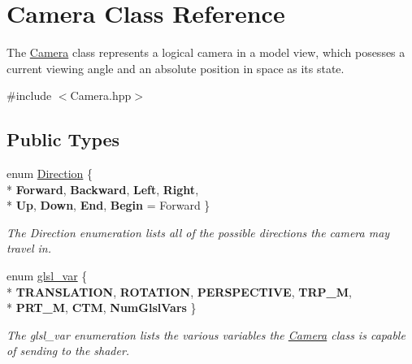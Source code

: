 \hypertarget{class_camera}{\section{Camera Class Reference}
\label{class_camera}
}


The \hyperlink{class_camera}{Camera} class represents a logical camera in a model view, which posesses a current viewing angle and an absolute position in space as its state.  




{\ttfamily \#include $<$Camera.\-hpp$>$}

\subsection*{Public Types}
\begin{DoxyCompactItemize}
\item 
enum \hyperlink{class_camera_a80cb65605322d27ad3b6d973484509ec}{Direction} \{ \\*
{\bfseries Forward}, 
{\bfseries Backward}, 
{\bfseries Left}, 
{\bfseries Right}, 
\\*
{\bfseries Up}, 
{\bfseries Down}, 
{\bfseries End}, 
{\bfseries Begin} =  Forward
 \}
\begin{DoxyCompactList}\small\item\em The Direction enumeration lists all of the possible directions the camera may travel in. \end{DoxyCompactList}\item 
enum \hyperlink{class_camera_a6ff726a75a430e4f17e5dec42e4d4405}{glsl\-\_\-var} \{ \\*
{\bfseries T\-R\-A\-N\-S\-L\-A\-T\-I\-O\-N}, 
{\bfseries R\-O\-T\-A\-T\-I\-O\-N}, 
{\bfseries P\-E\-R\-S\-P\-E\-C\-T\-I\-V\-E}, 
{\bfseries T\-R\-P\-\_\-\-M}, 
\\*
{\bfseries P\-R\-T\-\_\-\-M}, 
{\bfseries C\-T\-M}, 
{\bfseries Num\-Glsl\-Vars}
 \}
\begin{DoxyCompactList}\small\item\em The glsl\-\_\-var enumeration lists the various variables the \hyperlink{class_camera}{Camera} class is capable of sending to the shader. \end{DoxyCompactList}\end{DoxyCompactItemize}
